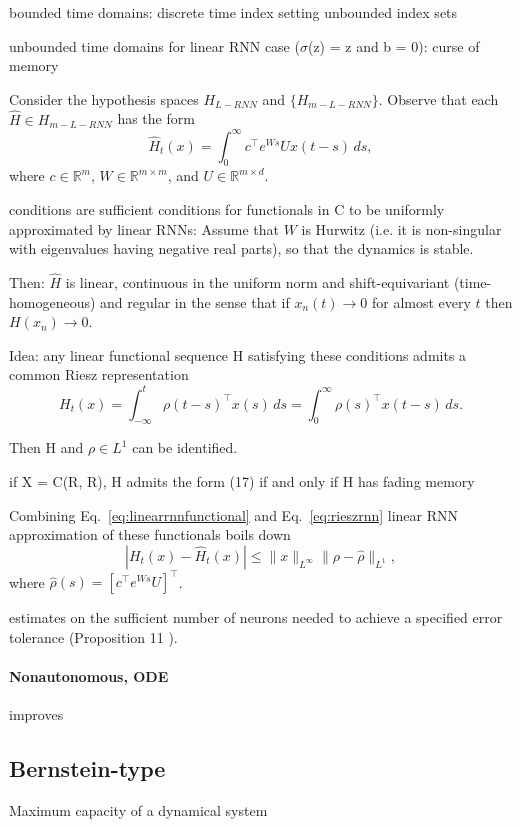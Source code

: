 \documentclass{article}
\theoremstyle{definition}
\theoremstyle{remark}
\begin{document}
bounded time domains:
discrete time index setting \citep{gonon2023approximation}
unbounded index sets \citep{hanson2020universal}

unbounded time domains for linear RNN case ($\sigma$(z) = z and b = 0): 
curse of memory \citep{li2020curse}
\citep{li2022approximation}

Consider the hypothesis spaces \( H_{L-RNN} \) and \( \{ H_{m-L-RNN} \} \). Observe that each \( \hat{H} \in H_{m-L-RNN} \) has the form
\begin{equation}\label{eq:linearrnnfunctional}
\hat{H}_t(x) = \int_{0}^{\infty} c^\top e^{W s} U x(t - s) \, ds,
\end{equation}
where \( c \in \mathbb{R}^m \), \( W \in \mathbb{R}^{m \times m} \), and \( U \in \mathbb{R}^{m \times d} \).

conditions are sufficient conditions for functionals in C to be uniformly approximated by linear RNNs: 
Assume that $W$ is Hurwitz (i.e. it is non-singular with eigenvalues having negative real parts), so that the dynamics is stable.

Then: $\hat{H}$ is linear, continuous in the uniform norm and shift-equivariant (time-homogeneous) and regular in the sense that if $x_n(t) \rightarrow 0$ for almost every $t$ then $H(x_n) \rightarrow 0$.



Idea: 
any linear functional sequence H satisfying these conditions admits a common Riesz representation
\begin{equation}\label{eq:rieszrnn}
H_t(x) = \int_{-\infty}^{t} \rho(t - s)^\top x(s) \, ds = \int_{0}^{\infty} \rho(s)^\top x(t - s) \, ds.
\end{equation}

Then H and $\rho \in L^1$ can be identified.
    


if X = C(R, R), H admits the form (17) if and only if H has fading memory \citep{boyd1985fading}


Combining Eq.~\ref{eq:linearrnnfunctional} and Eq.~\ref{eq:rieszrnn}
linear RNN approximation of these functionals boils down
\begin{equation}\label{eq:linearrnnapprox}
|H_t(x) - \hat{H}_t(x)| \leq \|x\|_{L^\infty} \|\rho - \hat{\rho}\|_{L^1},
\end{equation}
where $\hat{\rho}(s) = [c^\top e^{W s} U]^\top$.


estimates on the sufficient number of neurons needed to achieve a specified error tolerance (Proposition 11 \citep{hanson2020universal}). 


\paragraph{Nonautonomous, ODE}
\citep{becerra2005efficient} improves \citep{garces2012strategies}


\citep{hwang2022minimal}


\subsection{Bernstein-type}
Maximum capacity of a dynamical system\citep{dambre2012}



\newpage

\end{document}
